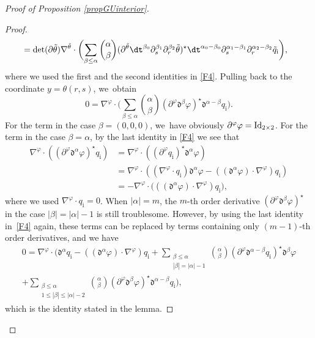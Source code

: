 \begin{proof}[Proof of Proposition \ref{propGUinterior}]
\begin{proof}
\begin{align*}
&= \det(\partial\tilde{\theta})\nabla^{\tilde{\theta}}\cdot\biggl(\sum_{\beta\leq\alpha} \binom{\alpha}{\beta}
(\partial^{\tilde{\theta}}\dt^{\beta_0}\partial_s^{\beta_1}\partial_r^{\beta_2}\tilde{\theta})^\star
\dt^{\alpha_0-\beta_0}\partial_s^{\alpha_1-\beta_1}\partial_r^{\alpha_2-\beta_2}\tilde{q}_\mathrm{i} \biggr),
\end{align*}
where we used the first and the second identities in \eqref{F4}.
Pulling back to the coordinate $y=\theta(r,s)$, we~obtain
\[
0 = \nabla^\varphi\cdot\biggl(\sum_{\beta\leq\alpha} \binom{\alpha}{\beta}
(\partial^\varphi\mathfrak{d}^{\beta}\varphi)^\star \mathfrak{d}^{\alpha-\beta} q_\mathrm{i} \biggr).
\]
For the term in the case $\beta=(0,0,0)$, we~have obviously $\partial^\varphi\varphi={\rm Id}_{2\times2}$.
For the term in the case $\beta=\alpha$, by the last identity in \eqref{F4} we see that
\begin{align*}
\nabla^\varphi\cdot((\partial^\varphi\mathfrak{d}^{\alpha}\varphi)^\star q_\mathrm{i})
&= \nabla^\varphi\cdot ((\partial^\varphi q_\mathrm{i})^\star\mathfrak{d}^{\alpha}\varphi) \\
&= \nabla^\varphi\cdot ((\nabla^\varphi\cdot q_\mathrm{i})\mathfrak{d}^{\alpha}\varphi - ((\mathfrak{d}^{\alpha}\varphi)\cdot\nabla^\varphi)q_\mathrm{i}) \\
&= -\nabla^\varphi\cdot \bigl(((\mathfrak{d}^{\alpha}\varphi)\cdot\nabla^\varphi)q_\mathrm{i} \bigr),
\end{align*}
where we used $\nabla^\varphi\cdot q_\mathrm{i}=0$.
When $|\alpha|=m$, the $m$-th order derivative $(\partial^\varphi\mathfrak{d}^{\beta}\varphi)^\star$ in the case $|\beta|=|\alpha|-1$ is still troublesome.
However, by using the last identity in~\eqref{F4} again, these terms can be replaced by terms containing only $(m-1)$-th order derivatives,
and we have
\begin{multline*}
0 = \nabla^\varphi\cdot\biggl(\mathfrak{d}^{\alpha} q_\mathrm{i} - ((\mathfrak{d}^{\alpha}\varphi)\cdot\nabla^\varphi)q_\mathrm{i}
+ \sum_{\substack{\beta\leq\alpha\\ |\beta|=|\alpha|-1}}\binom{\alpha}{\beta} (\partial^\varphi\mathfrak{d}^{\alpha-\beta} q_\mathrm{i})^\star \mathfrak{d}^{\beta}\varphi \\[-10pt]
+ \sum_{\substack{\beta\leq\alpha\\ 1 \leq |\beta| \leq |\alpha|-2}} \binom{\alpha}{\beta}
(\partial^\varphi\mathfrak{d}^{\beta}\varphi)^\star \mathfrak{d}^{\alpha-\beta} q_\mathrm{i} \biggr),
\end{multline*}
which is the identity stated in the lemma.
\end{proof}


\end{proof}
